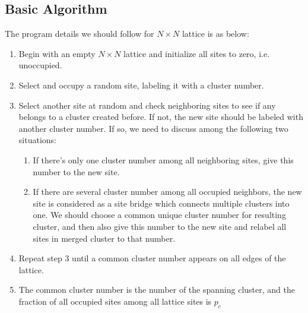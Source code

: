 \documentclass[12pt]{article}
\begin{document}
\subsection{Basic Algorithm}
\indent The program details we should follow for $N\times N$ lattice is as below:\\
\begin{enumerate}
\item Begin with an empty $N\times N$ lattice and initialize all sites to zero, i.e. unoccupied.
\item Select and occupy a random site, labeling it with a cluster number.
\item Select another site at random and check neighboring sites to see if any belongs to a cluster created before. If not, the new site should be labeled with another cluster number. If so, we need to discuss among the following two situations:

\begin{enumerate}
\item If there's only one cluster number among all neighboring sites, give this number to the new site.
\item If there are several cluster number among all occupied neighbors, the new site is considered as a site bridge which connects multiple clusters into one. We should choose a common unique cluster number for resulting cluster, and then also give this number to the new site and relabel all sites in merged cluster to that number.
\end{enumerate}

\item Repeat step 3 until a common cluster number{} appears on all edges of the lattice.
\item The common cluster number is the number of the spanning cluster, and the fraction of all occupied sites among all lattice sites is $p_c$
\end{enumerate}
\end{document}
